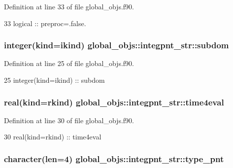 Definition at line 33 of file global\+\_\+objs.\+f90.


\begin{DoxyCode}
33     \textcolor{keywordtype}{logical} :: preproc=.false.
\end{DoxyCode}
\subsubsection[{subdom}]{\setlength{\rightskip}{0pt plus 5cm}integer(kind=ikind) global\+\_\+objs\+::integpnt\+\_\+str\+::subdom}\label{structglobal__objs_1_1integpnt__str_a598605d722e255b97ba8fa807dac50f5}


Definition at line 25 of file global\+\_\+objs.\+f90.


\begin{DoxyCode}
25     \textcolor{keywordtype}{integer(kind=ikind)} :: subdom
\end{DoxyCode}
\subsubsection[{time4eval}]{\setlength{\rightskip}{0pt plus 5cm}real(kind=rkind) global\+\_\+objs\+::integpnt\+\_\+str\+::time4eval}\label{structglobal__objs_1_1integpnt__str_afef2a7be0e7dcbea598c887c43589748}


Definition at line 30 of file global\+\_\+objs.\+f90.


\begin{DoxyCode}
30     \textcolor{keywordtype}{real(kind=rkind)} :: time4eval
\end{DoxyCode}
\subsubsection[{type\+\_\+pnt}]{\setlength{\rightskip}{0pt plus 5cm}character(len=4) global\+\_\+objs\+::integpnt\+\_\+str\+::type\+\_\+pnt}\label{structglobal__objs_1_1integpnt__str_a0d7dd775c8fbc3c8df7bfd97332fe7cc}


